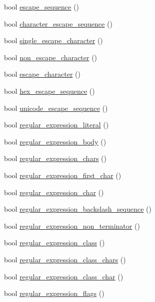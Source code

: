 \begin{DoxyCompactItemize}
\item 
bool \hyperlink{class_lexical_grammar_aba86d71a98d0bf2f7ad78e22b1c906f0}{escape\+\_\+sequence} ()
\item 
bool \hyperlink{class_lexical_grammar_abf0678a4b3e6cf81cfb7e87fdc88a1ab}{character\+\_\+escape\+\_\+sequence} ()
\item 
bool \hyperlink{class_lexical_grammar_a5ef26a3dd4d2c39ba5016675d3afa8dd}{single\+\_\+escape\+\_\+character} ()
\item 
bool \hyperlink{class_lexical_grammar_a6c3dc0efec370cfadc61e11ae53af449}{non\+\_\+escape\+\_\+character} ()
\item 
bool \hyperlink{class_lexical_grammar_a5f2624873c3468c05a40c2e186253eec}{escape\+\_\+character} ()
\item 
bool \hyperlink{class_lexical_grammar_a76722915a4ae4e864ffd7c750da8c9aa}{hex\+\_\+escape\+\_\+sequence} ()
\item 
bool \hyperlink{class_lexical_grammar_a411dd476c213ddb338a80766596d0d74}{unicode\+\_\+escape\+\_\+sequence} ()
\item 
bool \hyperlink{class_lexical_grammar_a86df93444a68819148ce938342342b84}{regular\+\_\+expression\+\_\+literal} ()
\item 
bool \hyperlink{class_lexical_grammar_ac4fed727bab8e01ddef683e8638f3975}{regular\+\_\+expression\+\_\+body} ()
\item 
bool \hyperlink{class_lexical_grammar_a21d16ea0d1b6b26e45da2e0af6149fbc}{regular\+\_\+expression\+\_\+chars} ()
\item 
bool \hyperlink{class_lexical_grammar_afc3a2aeab485760400e58836e00c3d70}{regular\+\_\+expression\+\_\+first\+\_\+char} ()
\item 
bool \hyperlink{class_lexical_grammar_ad48826aa5f41c65db545c80f791251b2}{regular\+\_\+expression\+\_\+char} ()
\item 
bool \hyperlink{class_lexical_grammar_ab25a92427eff914c4a1b01cd15cae9c5}{regular\+\_\+expression\+\_\+backslash\+\_\+sequence} ()
\item 
bool \hyperlink{class_lexical_grammar_a759b85cb75cdfbad63325a40d117b5ad}{regular\+\_\+expression\+\_\+non\+\_\+terminator} ()
\item 
bool \hyperlink{class_lexical_grammar_a4ea2fac37d3c75b080966f3dc0fb9fe4}{regular\+\_\+expression\+\_\+class} ()
\item 
bool \hyperlink{class_lexical_grammar_a77f711dd4ef77b6ab36222ec0914ef8c}{regular\+\_\+expression\+\_\+class\+\_\+chars} ()
\item 
bool \hyperlink{class_lexical_grammar_a13f847b3be28cea576bf29ad7d779c48}{regular\+\_\+expression\+\_\+class\+\_\+char} ()
\item 
bool \hyperlink{class_lexical_grammar_adf9549c929bfd16abf7b7b880c9ee3cf}{regular\+\_\+expression\+\_\+flags} ()
\end{DoxyCompactItemize}
